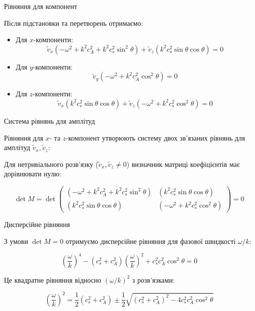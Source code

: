 \documentclass[]{beamer}
\begin{document}
\begin{frame}{Рівняння для компонент}

Після підстановки та перетворень отримаємо:

\begin{itemize}
\item Для $x$-компоненти:
\[ \tilde{v}_{x}(-\omega^2 + k^2 c_A^2 + k^2 c_s^2 \sin^2 \theta) + \tilde{v}_{z}(k^2 c_s^2 \sin \theta \cos \theta) = 0 \]

\item Для $y$-компоненти:
\[ \tilde{v}_{y}(-\omega^2 + k^2 c_A^2 \cos^2 \theta) = 0 \]

\item Для $z$-компоненти:
\[ \tilde{v}_{x}(k^2 c_s^2 \sin \theta \cos \theta) + \tilde{v}_{z}(-\omega^2 + k^2 c_s^2 \cos^2 \theta) = 0 \]
\end{itemize}
\end{frame}


\begin{frame}{Система рівнянь для амплітуд}

Рівняння для $x$- та $z$-компонент утворюють систему двох зв'язаних рівнянь для амплітуд $\tilde{v}_{x}, \tilde{v}_{z}$:

\medskip
Для нетривіального розв'язку ($\tilde{v}_{x}, \tilde{v}_{z} \neq 0$) визначник матриці коефіцієнтів має дорівнювати нулю:

\[
\det M = \det
\begin{pmatrix}
(-\omega^2 + k^2c_A^2 + k^2c_s^2 \sin^2 \theta) & (k^2c_s^2 \sin \theta \cos \theta) \\
(k^2c_s^2 \sin \theta \cos \theta) & (-\omega^2 + k^2c_s^2 \cos^2 \theta)
\end{pmatrix}
= 0
\]
\end{frame}

\begin{frame}{Дисперсійне рівняння}

З умови $\det M = 0$ отримуємо дисперсійне рівняння для фазової швидкості $\omega/k$:

\[
\left( \frac{\omega}{k} \right)^4 - (c_s^2 + c_A^2) \left( \frac{\omega}{k} \right)^2 + c_s^2c_A^2 \cos^2 \theta = 0
\]

\medskip
Це квадратне рівняння відносно $(\omega/k)^2$ з розв'язками:

\[
\left( \frac{\omega}{k} \right)^2 = \frac{1}{2}(c_s^2 + c_A^2) \pm \frac{1}{2}\sqrt{(c_s^2 + c_A^2)^2 - 4c_s^2c_A^2 \cos^2 \theta}
\]
\end{frame}
\end{document}

